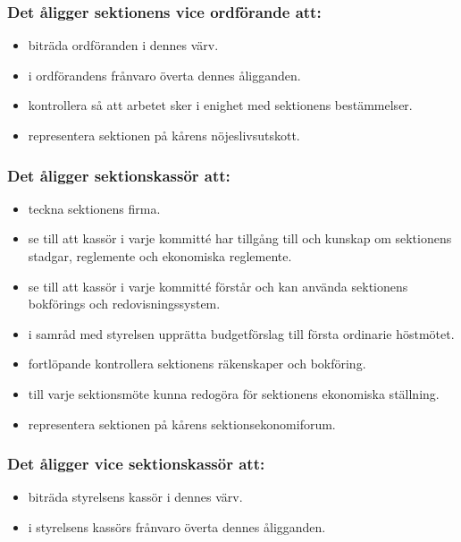 \subsubsection{Det åligger sektionens vice ordförande att:}

\begin{itemize}
  \item biträda ordföranden i dennes värv.
  \item i ordförandens frånvaro överta dennes åligganden.
  \item kontrollera så att arbetet sker i enighet med sektionens bestämmelser.
  \item representera sektionen på kårens nöjeslivsutskott.
\end{itemize}

\subsubsection{Det åligger sektionskassör att:}

\begin{itemize}
  \item teckna sektionens firma.
  \item se till att kassör i varje kommitté har tillgång till och kunskap om sektionens stadgar, reglemente och ekonomiska reglemente.
  \item se till att kassör i varje kommitté förstår och kan använda sektionens bokförings och redovisningssystem.
  \item i samråd med styrelsen upprätta budgetförslag till första ordinarie höstmötet.
  \item fortlöpande kontrollera sektionens räkenskaper och bokföring.
  \item till varje sektionsmöte kunna redogöra för sektionens ekonomiska ställning.
  \item representera sektionen på kårens sektionsekonomiforum.
\end{itemize}

\subsubsection{Det åligger vice sektionskassör att:}

\begin{itemize}
  \item biträda styrelsens kassör i dennes värv.
  \item i styrelsens kassörs frånvaro överta dennes åligganden.
\end{itemize}

